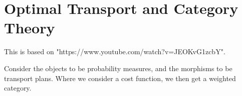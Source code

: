 \section{Optimal Transport and Category Theory}

This is based on "https://www.youtube.com/watch?v=JEOKvG1zcbY".

Consider the objects to be probability measures, and the morphisms
to be transport plans. Where we consider a cost function, we then
get a weighted category.
